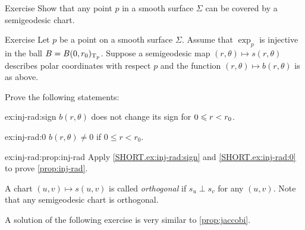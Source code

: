 \begin{thm}{Exercise}\label{ex:semigeodesc-chart}
Show that any point $p$ in a smooth surface $\Sigma$ can be covered by a semigeodesic chart.
\end{thm}

\begin{thm}{Exercise}\label{ex:inj-rad}
Let $p$ be a point on a smooth surface $\Sigma$.
Assume that $\exp_p$ is injective in the ball $B=B(0,r_0)_{\mathrm{T}_p}$.
Suppose a semigeodesic map $(r,\theta)\mapsto s(r,\theta)$ describes polar coordinates with respect $p$ and the function $(r,\theta)\mapsto b(r,\theta)$ is as above.

Prove the following statements:

\begin{subthm}{ex:inj-rad:sign}
$b(r,\theta)$ does not change its sign for $0\z\le r\z<r_0$.
\end{subthm}

\begin{subthm}{ex:inj-rad:0}
$b(r,\theta)\ne0$ if $0\le r<r_0$.
\end{subthm}

\begin{subthm}{ex:inj-rad:prop:inj-rad}
Apply \ref{SHORT.ex:inj-rad:sign} and \ref{SHORT.ex:inj-rad:0} to prove \ref{prop:inj-rad}.
\end{subthm}
 
\end{thm}



A chart $(u,v)\mapsto s(u,v)$ is called \emph{orthogonal} if $s_u\perp s_v$ for any $(u,v)$.
Note that any semigeodesic chart is orthogonal.

A solution of the following exercise is very similar to \ref{prop:jaccobi}.

